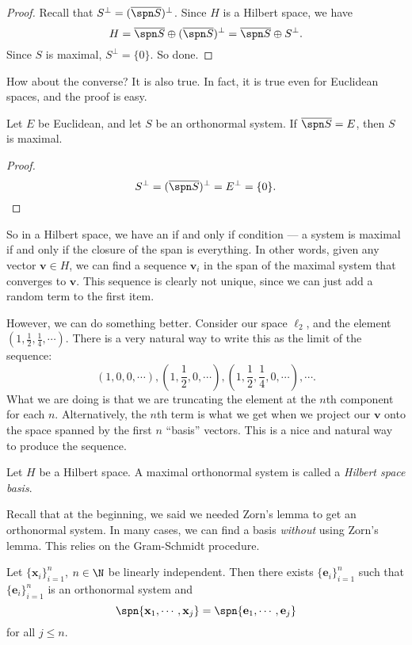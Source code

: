 \documentclass[a4paper]{article}
\begin{document}
\begin{proof}
  Recall that $S^\perp = (\overline{\spn S})^\perp$. Since $H$ is a Hilbert space, we have
  \[
    H = \overline{\spn S} \oplus (\overline{\spn S})^\perp = \overline{\spn S} \oplus S^\perp.
  \]
  Since $S$ is maximal, $S^\perp = \{0\}$. So done.
\end{proof}

How about the converse? It is also true. In fact, it is true even for Euclidean spaces, and the proof is easy.

\begin{prop}
  Let $E$ be Euclidean, and let $S$ be an orthonormal system. If $\overline{\spn S} = E$, then $S$ is maximal.
\end{prop}

\begin{proof}
  \[
    S^\perp = (\overline{\spn S})^\perp = E^\perp = \{0\}.\qedhere
  \]
\end{proof}
So in a Hilbert space, we have an if and only if condition --- a system is maximal if and only if the closure of the span is everything. In other words, given any vector $\mathbf{v} \in H$, we can find a sequence $\mathbf{v}_i$ in the span of the maximal system that converges to $\mathbf{v}$. This sequence is clearly not unique, since we can just add a random term to the first item.

However, we can do something better. Consider our space $\ell_2$, and the element $(1, \frac{1}{2}, \frac{1}{4}, \cdots)$. There is a very natural way to write this as the limit of the sequence:
\[
  (1, 0, 0, \cdots), \left(1, \frac{1}{2}, 0, \cdots\right), \left(1, \frac{1}{2}, \frac{1}{4}, 0, \cdots\right), \cdots.
\]
What we are doing is that we are truncating the element at the $n$th component for each $n$. Alternatively, the $n$th term is what we get when we project our $\mathbf{v}$ onto the space spanned by the first $n$ ``basis'' vectors. This is a nice and natural way to produce the sequence.

\begin{defi}
  Let $H$ be a Hilbert space. A maximal orthonormal system is called a \emph{Hilbert space basis}.
\end{defi}

Recall that at the beginning, we said we needed Zorn's lemma to get an orthonormal system. In many cases, we can find a basis \emph{without} using Zorn's lemma. This relies on the Gram-Schmidt procedure.

\begin{prop}
  Let $\{\mathbf{x}_i\}_{i = 1}^n$, $n \in \N$ be linearly independent. Then there exists $\{\mathbf{e}_i\}_{i = 1}^n$ such that $\{\mathbf{e}_i\}_{i = 1}^n$ is an orthonormal system and
  \[
    \spn\{\mathbf{x}_1, \cdots, \mathbf{x}_j\} = \spn\{\mathbf{e}_1, \cdots, \mathbf{e}_j\}
  \]
  for all $j \leq n$.
\end{prop}
\end{document}
